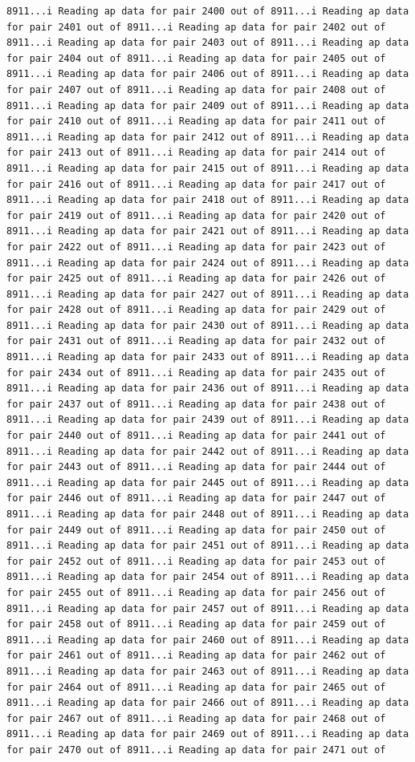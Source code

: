 \documentclass[
]{article}
\begin{document}
\begin{verbatim}
8911...i Reading ap data for pair 2400 out of 8911...i Reading ap data for pair 2401 out of 8911...i Reading ap data for pair 2402 out of 8911...i Reading ap data for pair 2403 out of 8911...i Reading ap data for pair 2404 out of 8911...i Reading ap data for pair 2405 out of 8911...i Reading ap data for pair 2406 out of 8911...i Reading ap data for pair 2407 out of 8911...i Reading ap data for pair 2408 out of 8911...i Reading ap data for pair 2409 out of 8911...i Reading ap data for pair 2410 out of 8911...i Reading ap data for pair 2411 out of 8911...i Reading ap data for pair 2412 out of 8911...i Reading ap data for pair 2413 out of 8911...i Reading ap data for pair 2414 out of 8911...i Reading ap data for pair 2415 out of 8911...i Reading ap data for pair 2416 out of 8911...i Reading ap data for pair 2417 out of 8911...i Reading ap data for pair 2418 out of 8911...i Reading ap data for pair 2419 out of 8911...i Reading ap data for pair 2420 out of 8911...i Reading ap data for pair 2421 out of 8911...i Reading ap data for pair 2422 out of 8911...i Reading ap data for pair 2423 out of 8911...i Reading ap data for pair 2424 out of 8911...i Reading ap data for pair 2425 out of 8911...i Reading ap data for pair 2426 out of 8911...i Reading ap data for pair 2427 out of 8911...i Reading ap data for pair 2428 out of 8911...i Reading ap data for pair 2429 out of 8911...i Reading ap data for pair 2430 out of 8911...i Reading ap data for pair 2431 out of 8911...i Reading ap data for pair 2432 out of 8911...i Reading ap data for pair 2433 out of 8911...i Reading ap data for pair 2434 out of 8911...i Reading ap data for pair 2435 out of 8911...i Reading ap data for pair 2436 out of 8911...i Reading ap data for pair 2437 out of 8911...i Reading ap data for pair 2438 out of 8911...i Reading ap data for pair 2439 out of 8911...i Reading ap data for pair 2440 out of 8911...i Reading ap data for pair 2441 out of 8911...i Reading ap data for pair 2442 out of 8911...i Reading ap data for pair 2443 out of 8911...i Reading ap data for pair 2444 out of 8911...i Reading ap data for pair 2445 out of 8911...i Reading ap data for pair 2446 out of 8911...i Reading ap data for pair 2447 out of 8911...i Reading ap data for pair 2448 out of 8911...i Reading ap data for pair 2449 out of 8911...i Reading ap data for pair 2450 out of 8911...i Reading ap data for pair 2451 out of 8911...i Reading ap data for pair 2452 out of 8911...i Reading ap data for pair 2453 out of 8911...i Reading ap data for pair 2454 out of 8911...i Reading ap data for pair 2455 out of 8911...i Reading ap data for pair 2456 out of 8911...i Reading ap data for pair 2457 out of 8911...i Reading ap data for pair 2458 out of 8911...i Reading ap data for pair 2459 out of 8911...i Reading ap data for pair 2460 out of 8911...i Reading ap data for pair 2461 out of 8911...i Reading ap data for pair 2462 out of 8911...i Reading ap data for pair 2463 out of 8911...i Reading ap data for pair 2464 out of 8911...i Reading ap data for pair 2465 out of 8911...i Reading ap data for pair 2466 out of 8911...i Reading ap data for pair 2467 out of 8911...i Reading ap data for pair 2468 out of 8911...i Reading ap data for pair 2469 out of 8911...i Reading ap data for pair 2470 out of 8911...i Reading ap data for pair 2471 out of 
\end{verbatim}
\end{document}
